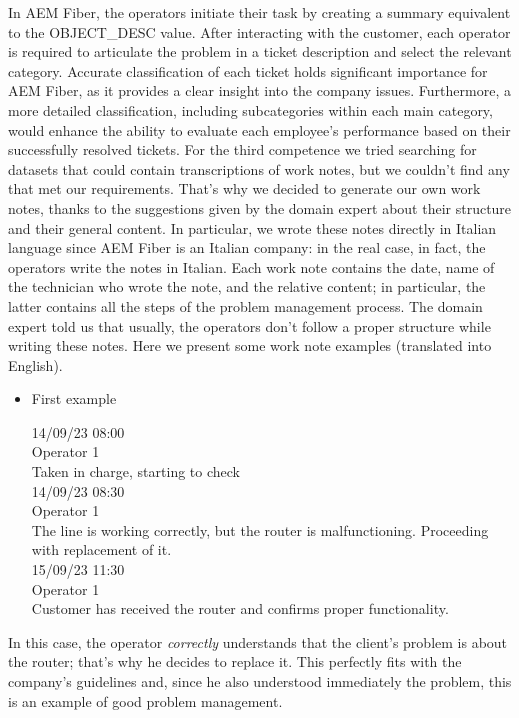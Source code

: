 In AEM Fiber, the operators initiate their task by creating a summary equivalent to the OBJECT\_DESC value. After interacting with the customer, each operator is required to articulate the problem in a ticket description and select the relevant category. Accurate classification of each ticket holds significant importance for AEM Fiber, as it provides a clear insight into the company issues. Furthermore, a more detailed classification, including subcategories within each main category, would enhance the ability to evaluate each employee's performance based on their successfully resolved tickets.
For the third competence we tried searching for datasets that could contain transcriptions of work notes, but we couldn't find any that met our requirements. That's why we decided to generate our own work notes, thanks to the suggestions given by the domain expert about their structure and their general content. In particular, we wrote these notes directly in Italian language since AEM Fiber is an Italian company: in the real case, in fact, the operators write the notes in Italian.
Each work note contains the date, name of the technician who wrote the note, and the relative content; in particular, the latter contains all the steps of the problem management process. The domain expert told us that usually, the operators don't follow a proper structure while writing these notes. \label{sec:datasetProblemManagement}
Here we present some work note examples (translated into English).
\begin{itemize}

      \item First example

            14/09/23 08:00\\
            Operator 1\\
            Taken in charge, starting to check\\

            14/09/23 08:30\\
            Operator 1\\
            The line is working correctly, but the router is malfunctioning. Proceeding with replacement of it.\\

            15/09/23 11:30\\
            Operator 1\\
            Customer has received the router and confirms proper functionality.
\end{itemize}
In this case, the operator \textit{correctly} understands that the client's problem is about the router; that's why he decides to replace it. This perfectly fits with the company's guidelines and, since he also understood immediately the problem, this is an example of good problem management.
